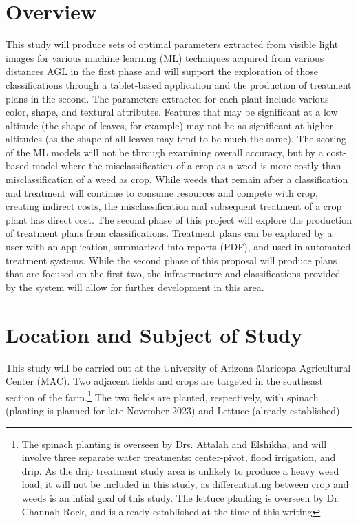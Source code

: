 \documentclass[12pt]{article}
\begin{document}
{
\begin{versionhistory}
\end{versionhistory}
\newpage
}


%
%

\section{Overview}
\label{section:proposal}
This study will produce sets of optimal parameters extracted from visible light images for various machine learning (ML) techniques acquired from various distances AGL in the first phase and will support the exploration of those classifications through a tablet-based application and the production of treatment plans in the second. The parameters extracted for each plant include various color, shape, and textural attributes. Features that may be significant at a low altitude (the shape of leaves, for example) may not be as significant at higher altitudes (as the shape of all leaves may tend to be much the same).
 The scoring of the ML models will not be through examining overall accuracy, but by a cost-based model where the misclassification of a crop as a weed is more costly than misclassification of a weed as crop. While weeds that remain after a classification and treatment will continue to consume resources and compete with crop, creating indirect costs, the misclassification and subsequent treatment of a crop plant has direct cost. The second phase of this project will explore the production of treatment plans from classifications. Treatment plans can be explored by a user with an application, summarized into reports (PDF), and used in automated treatment systems.  While the second phase of this proposal will  produce plans that are focused on the first two, the infrastructure and classifications provided by the system will allow for further development in this area.
\section{Location and Subject of Study}
This study will be carried out at the University of Arizona Maricopa Agricultural Center (MAC).  Two adjacent fields and crops are targeted in the southeast section of the farm.\footnote{The spinach planting is overseen by Drs. Attalah and Elshikha, and will involve three separate water treatments: center-pivot, flood irrigation, and drip. As the drip treatment study area is unlikely to produce a heavy weed load, it will not be included in this study, as differentiating between crop and weeds is an intial goal of this study.  The lettuce planting is overseen by Dr. Channah Rock, and is already established at the time of this writing} The two fields are planted, respectively, with spinach (planting is planned for late November 2023) and Lettuce (already established).
 
\end{document}
